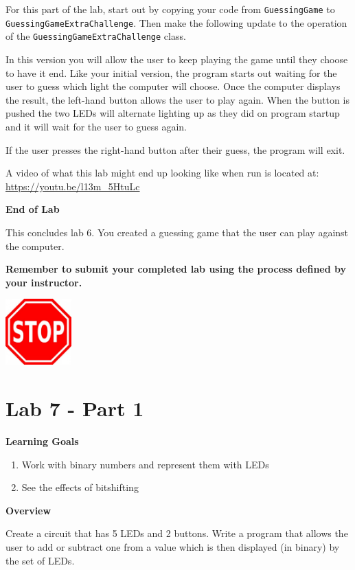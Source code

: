 For this part of the lab, start out by copying your code from \texttt{GuessingGame} to \texttt{GuessingGameExtraChallenge}. Then make the following update to the operation of the \texttt{GuessingGameExtraChallenge} class.

In this version you will allow the user to keep playing the game until they choose to have it end. Like your initial version, the program starts out waiting for the user to guess which light the computer will choose. Once the computer displays the result, the left-hand button allows the user to play again. When the button is pushed the two LEDs will alternate lighting up as they did on program startup and it will wait for the user to guess again.

If the user presses the right-hand button after their guess, the program will exit.

A video of what this lab might end up looking like when run is located at: \url{https://youtu.be/l13m_5HtuLc}

\textbf{End of Lab}

This concludes lab 6. You created a guessing game that the user can play against the computer.

\textbf{Remember to submit your completed lab using the process defined by your instructor.}

{\centering
	\beforefig
	\centerline{\includegraphics[height=1in]{pi_images/stop_sign_clip_art_16252.jpg}}
	\afterfig
}

\newpage

\section{Lab 7 - Part 1}

\textbf{Learning Goals}

\begin{enumerate}
	\item Work with binary numbers and represent them with LEDs
	\item See the effects of bitshifting
\end{enumerate}

\textbf{Overview}

Create a circuit that has 5 LEDs and 2 buttons. Write a program that allows the user to add or subtract one from a value which is then displayed (in binary) by the set of LEDs.


